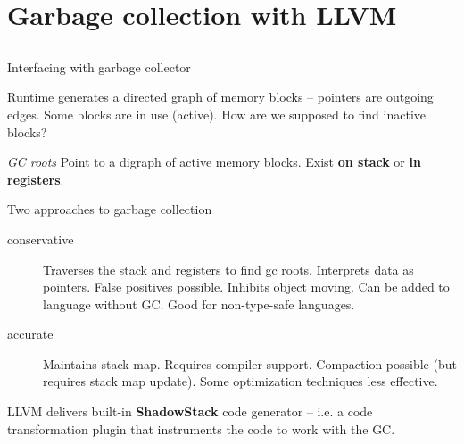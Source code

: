 \documentclass[8pt]{beamer}
\begin{document}
\section[Garbage collection]{Garbage collection with LLVM}
\subsection*{}

\begin{frame}{Interfacing with garbage collector}
  \begin{alertblock}{}
    Runtime generates a directed graph of memory blocks -- pointers are
    outgoing edges. Some blocks are in use (active). How are we supposed to
    find inactive blocks?
  \end{alertblock}

  \begin{block}{\textit{GC roots}}
    Point to a digraph of active memory blocks. Exist \textbf{on stack} or
    \textbf{in registers}.
  \end{block}

  \begin{block}{Two approaches to garbage collection}
    \begin{description}
      \item[conservative] Traverses the stack and registers to find gc roots.
        Interprets data as pointers. False positives possible. Inhibits object
        moving. Can be added to language without GC. Good for non-type-safe
        languages. 
      \item[accurate] Maintains stack map. Requires compiler support.
        Compaction possible (but requires stack map update). Some optimization
        techniques less effective.
    \end{description}
  \end{block}
  
  \begin{exampleblock}{}
    LLVM delivers built-in \textbf{ShadowStack} code generator -- i.e. a code
    transformation plugin that instruments the code to work with the GC.
  \end{exampleblock} 
\end{frame}
\end{document}
